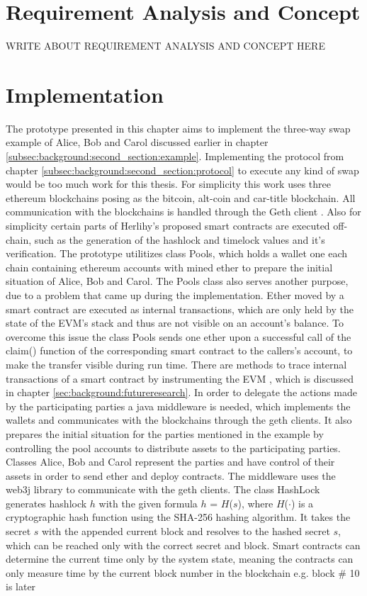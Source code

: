 \chapter{Requirement Analysis and Concept}
\label{ch:chapter03}
WRITE ABOUT REQUIREMENT ANALYSIS AND CONCEPT HERE

\chapter{Implementation}
\label{ch:chapter04}
The prototype presented in this chapter aims to implement the three-way swap example of Alice, Bob and Carol discussed earlier in chapter \ref{subsec:background:second_section:example}. Implementing the protocol from chapter \ref{subsec:background:second_section:protocol} to execute any kind of swap would be too much work for this thesis. For simplicity this work uses three ethereum blockchains posing as the bitcoin, alt-coin and car-title blockchain. All communication with the blockchains is handled through the Geth client \cite{gethclient}. Also for simplicity certain parts of Herlihy's proposed smart contracts are executed off-chain, such as the generation of the hashlock and timelock values and it's verification. The prototype utilitizes class Pools, which holds a wallet one each chain containing ethereum accounts with mined ether to prepare the initial situation of Alice, Bob and Carol. The Pools class also serves another purpose, due to a problem that came up during the implementation. Ether moved by a smart contract are executed as internal transactions, which are only held by the state of the \ac{EVM}'s stack and thus are not visible on an account's balance. To overcome this issue the class Pools sends one ether upon a successful call of the claim() function of the corresponding smart contract to the callers's account, to make the transfer visible during run time. There are methods to trace internal transactions of a smart contract by instrumenting the \ac{EVM} \cite{instrumentingEVM}, which is discussed in chapter \ref{sec:background:futureresearch}. In order to delegate the actions made by the participating parties a java middleware is needed, which implements the wallets and communicates with the blockchains through the geth clients. It also prepares the initial situation for the parties mentioned in the example by controlling the pool accounts to distribute assets to the participating parties. Classes Alice, Bob and Carol represent the parties and have control of their assets in order to send ether and deploy contracts. The middleware uses the web3j library \cite{web3j} to communicate with the geth clients. The class HashLock generates hashlock $h$ with the given formula $h$ = $H$($s$), where $H$($\cdot$) is a cryptographic hash function using the \ac{SHA-256} hashing algorithm. It takes the secret $s$ with the appended current block and resolves to the hashed secret $s$, which can be reached only with the correct secret and block. Smart contracts can determine the current time only by the system state, meaning the contracts can only measure time by the current block number in the blockchain e.g. block \# 10 is later 